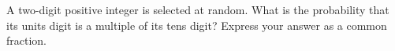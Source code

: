 A two-digit positive integer is selected at random. What is the probability that its units digit is a multiple of its tens digit? Express your answer as a common fraction.
